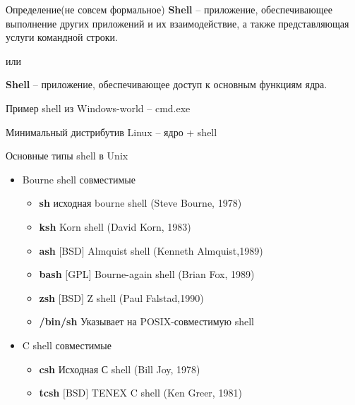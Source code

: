 \begin{frame}[fragile]{Определение(не совсем формальное)}
	\textbf{Shell} -- приложение, обеспечивающее выполнение других приложений и их взаимодействие, а также представляющая услуги командной строки. 
	\begin{center}
	 или
	\end{center}
	\textbf{Shell} -- приложение, обеспечивающее доступ к основным функциям ядра.

	\pause
	\vspace{0.5in}
	Пример shell из Windows-world -- cmd.exe
	\vspace{0.5in}

	Минимальный дистрибутив Linux -- ядро + shell 

\end{frame}

\begin{frame}[fragile]{Основные типы shell в Unix}
  \begin{itemize}
    \item Bourne shell совместимые
      \begin{itemize}
        \item \textbf{sh} исходная bourne shell (Steve Bourne, 1978)
        \item \textbf{ksh} Korn shell (David Korn, 1983)
        \item \textbf{ash} $[$BSD$]$ Almquist shell (Kenneth Almquist,1989)  
        \item \textbf{bash} $[$GPL$]$ Bourne-again shell (Brian Fox, 1989)
        \item \textbf{zsh} $[$BSD$]$ Z shell (Paul Falstad,1990)
        \item \textbf{/bin/sh} Указывает на POSIX-совместимую shell
      \end{itemize}
  \item C shell совместимые
      \begin{itemize}
        \item \textbf{csh}  Исходная С shell (Bill Joy, 1978)
        \item \textbf{tcsh} $[$BSD$]$ TENEX C shell (Ken Greer, 1981)
       \end{itemize}
  \end{itemize}
\end{frame}
